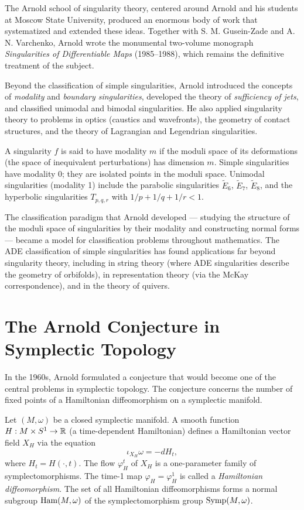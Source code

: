 The Arnold school of singularity theory, centered around Arnold and his students at Moscow State University, produced an enormous body of work that systematized and extended these ideas. Together with S. M. Gusein-Zade and A. N. Varchenko, Arnold wrote the monumental two-volume monograph \textit{Singularities of Differentiable Maps} (1985--1988), which remains the definitive treatment of the subject.

Beyond the classification of simple singularities, Arnold introduced the concepts of \emph{modality} and \emph{boundary singularities}, developed the theory of \emph{sufficiency of jets}, and classified unimodal and bimodal singularities. He also applied singularity theory to problems in optics (caustics and wavefronts), the geometry of contact structures, and the theory of Lagrangian and Legendrian singularities.

\begin{definition}[Modality]
A singularity \(f\) is said to have modality \(m\) if the moduli space of its deformations (the space of inequivalent perturbations) has dimension \(m\). Simple singularities have modality 0; they are isolated points in the moduli space. Unimodal singularities (modality 1) include the parabolic singularities \(\widetilde{E}_6\), \(\widetilde{E}_7\), \(\widetilde{E}_8\), and the hyperbolic singularities \(T_{p,q,r}\) with \(1/p + 1/q + 1/r < 1\).
\end{definition}

The classification paradigm that Arnold developed --- studying the structure of the moduli space of singularities by their modality and constructing normal forms --- became a model for classification problems throughout mathematics. The ADE classification of simple singularities has found applications far beyond singularity theory, including in string theory (where ADE singularities describe the geometry of orbifolds), in representation theory (via the McKay correspondence), and in the theory of quivers.

\section{The Arnold Conjecture in Symplectic Topology}

In the 1960s, Arnold formulated a conjecture that would become one of the central problems in symplectic topology. The conjecture concerns the number of fixed points of a Hamiltonian diffeomorphism on a symplectic manifold.

Let \((M,\omega)\) be a closed symplectic manifold. A smooth function \(H: M \times S^1 \to \mathbb{R}\) (a time-dependent Hamiltonian) defines a Hamiltonian vector field \(X_H\) via the equation
\[
\iota_{X_H}\omega = -dH_t,
\]
where \(H_t = H(\cdot,t)\). The flow \(\varphi_H^t\) of \(X_H\) is a one-parameter family of symplectomorphisms. The time-1 map \(\varphi_H = \varphi_H^1\) is called a \emph{Hamiltonian diffeomorphism}. The set of all Hamiltonian diffeomorphisms forms a normal subgroup \(\operatorname{Ham}(M,\omega)\) of the symplectomorphism group \(\operatorname{Symp}(M,\omega)\).

